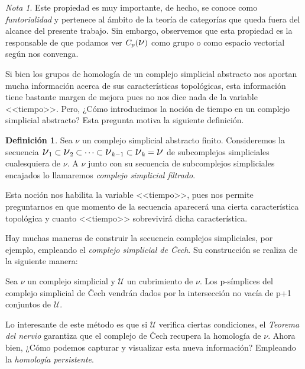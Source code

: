 \documentclass[12pt, a4paper]{article}
\numberwithin{equation}{section}
\theoremstyle{definition}
\newtheorem{defi}{Definición}
\theoremstyle{remark}
\newtheorem*{remark}{Nota}
\theoremstyle{plain}
\begin{document}
	\begin{remark}
		Este propiedad es muy importante, de hecho, se conoce como 
		\emph{funtorialidad} y pertenece al ámbito de la teoría de 
		categorías que queda fuera del alcance del presente trabajo. 
		Sin embargo, observemos que esta propiedad es la responsable 
		de que podamos ver $C_{p}(\text{{\Large $\nu$}})$ como grupo
		o como espacio vectorial según nos convenga.
	\end{remark}

	Si bien los grupos de homología de un complejo simplicial abstracto 
	nos aportan mucha información acerca de sus características 
	topológicas, esta información tiene bastante margen de mejora pues no
	nos dice nada de la variable <<tiempo>>. Pero, ¿Cómo introducimos la 
	noción de tiempo en un complejo simplicial abstracto? Esta pregunta
	motiva la siguiente definición.

	\begin{defi}
		Sea {\Large $\nu$} un complejo simplicial abstracto finito. 
		Consideremos la secuencia $ \text{{\Large $\nu$}$_{1}$} 
		\subset \text{{\Large $\nu$}$_{2}$} \subset \cdots \subset
		\text{{\Large $\nu$}$_{k-1}$} \subset 
		\text{{\Large $\nu$}$_{k}$} = \text{{\Large $\nu$}}$ de 
		subcomplejos simpliciales cualesquiera de {\Large $\nu$}. A
		{\Large $\nu$} junto con su secuencia de subcomplejos 
		simpliciales encajados lo llamaremos \textit{complejo 
		simplicial filtrado}. 
	\end{defi}

	Esta noción nos habilita la variable <<tiempo>>, pues nos permite 
	preguntarnos en que momento de la secuencia aparecerá una cierta 
	característica topológica y cuanto <<tiempo>> sobrevivirá dicha 
	característica.

	Hay muchas maneras de construir la secuencia complejos simpliciales, 
	por ejemplo, empleando el \emph{complejo simplicial de Čech}. Su 
	construcción se realiza de la siguiente manera:

	Sea {\Large $\nu$} un complejo simplicial y $\mathcal{U}$ un 
	cubrimiento de {\Large $\nu$}. Los p-símplices del complejo simplicial
	de Čech vendrán dados por la intersección no vacía de p+1 conjuntos de
	$\mathcal{U}$.

	Lo interesante de este método es que si $\mathcal{U}$ verifica ciertas
	condiciones, el \emph{Teorema del nervio} garantiza que el complejo de
	Čech recupera la homología de {\Large $\nu$}. Ahora bien, ¿Cómo 
	podemos capturar y visualizar esta nueva información? Empleando la 
	\emph{homología persistente}.
\end{document}

